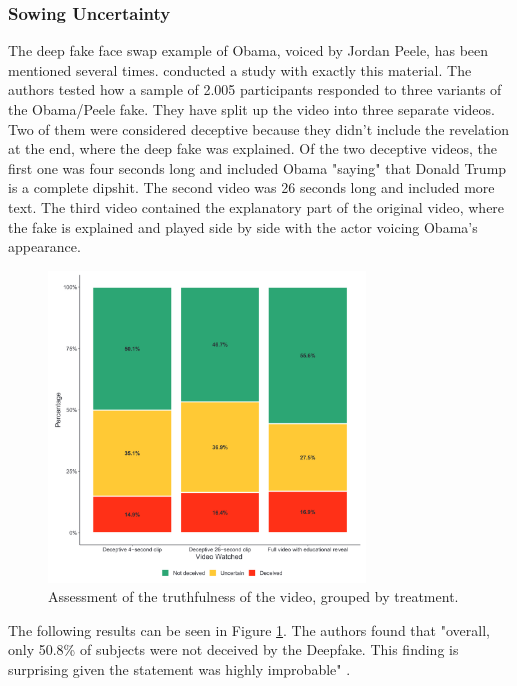 \documentclass[
  a4paper,  %
  twoside,  %
  bibliography=totoc,
  headsepline,
  cleardoublepage=empty,
  parskip=half,
  draft=false
]{scrbook}
\begin{document}
\subsubsection*{Sowing Uncertainty}
The deep fake face swap example of Obama, voiced by Jordan Peele, has been mentioned several times. \citeauthor{vaccariDeepfakesDisinformationExploring2020} conducted a study with exactly this material. The authors tested how a sample of 2.005 participants responded to three variants of the Obama/Peele fake. They have split up the video into three separate videos. Two of them were considered deceptive because they didn't include the revelation at the end, where the deep fake was explained. Of the two deceptive videos, the first one was four seconds long and included Obama "saying" that Donald Trump is a complete dipshit. The second video was 26 seconds long and included more text. The third video contained the explanatory part of the original video, where the fake is explained and played side by side with the actor voicing Obama's appearance.
\begin{figure}[h]
  \centering
  \includegraphics[width=0.75\textwidth]{./graphics/images/obamafake.png}
  \caption{Assessment of the truthfulness of the video, grouped by treatment. \cite{vaccariDeepfakesDisinformationExploring2020}}
  \label{fig:obamafake-eval}
\end{figure}
The following results can be seen in Figure \ref{fig:obamafake-eval}. The authors found that "overall, only 50.8\% of subjects were not deceived by the Deepfake. This finding is surprising given the statement was highly improbable" \cite{vaccariDeepfakesDisinformationExploring2020}. 
\end{document}
